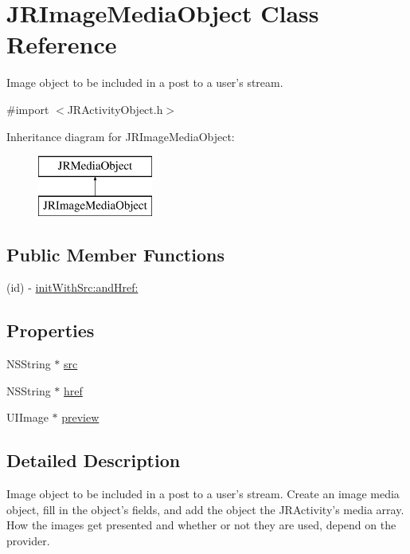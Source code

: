\hypertarget{interface_j_r_image_media_object}{
\section{JRImageMediaObject Class Reference}
\label{interface_j_r_image_media_object}
}


Image object to be included in a post to a user's stream.  




{\ttfamily \#import $<$JRActivityObject.h$>$}

Inheritance diagram for JRImageMediaObject:\begin{figure}[H]
\begin{center}
\leavevmode
\includegraphics[height=2.000000cm]{interface_j_r_image_media_object}
\end{center}
\end{figure}
\subsection*{Public Member Functions}
\begin{DoxyCompactItemize}
\item 
(id) -\/ \hyperlink{interface_j_r_image_media_object_a8a15f579b784dbdcdaeea9dc1da56cb3}{initWithSrc:andHref:}
\end{DoxyCompactItemize}
\subsection*{Properties}
\begin{DoxyCompactItemize}
\item 
NSString $\ast$ \hyperlink{interface_j_r_image_media_object_aad75823f9189dfca758bc4d4712c3621}{src}
\item 
NSString $\ast$ \hyperlink{interface_j_r_image_media_object_a95642c3f4bc97a112a3ab32beef46f66}{href}
\item 
UIImage $\ast$ \hyperlink{interface_j_r_image_media_object_adffd5bbca7eb9c92e720b821022aca88}{preview}
\end{DoxyCompactItemize}


\subsection{Detailed Description}
Image object to be included in a post to a user's stream. Create an image media object, fill in the object's fields, and add the object the JRActivity's media array. How the images get presented and whether or not they are used, depend on the provider.


